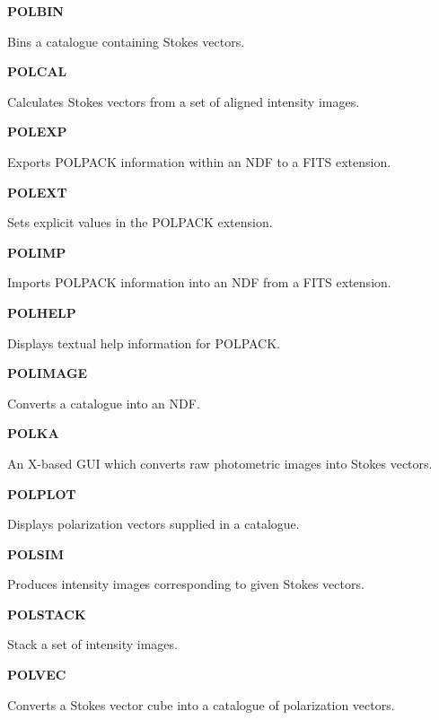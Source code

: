 \documentclass[twoside,11pt]{article}
\newenvironment{latexonly}{}{}
\renewcommand{\_}{\texttt{\symbol{95}}}
\newcommand{\quickdes}[3]{
                         \parbox{1.1in}{\bf #1}
                         \parbox{4.4in}{\raggedright #2 \dotfill}
                         \parbox{0.6in}{\pageref{#3}}
                         \vspace*{0.2in}}
\begin{document}
\newpage
\begin{latexonly}
\quickdes{POLBIN}{Bins a catalogue containing Stokes vectors.}{ POLBIN }

\quickdes{POLCAL}{Calculates Stokes vectors from a set of aligned intensity images.}{ POLCAL }

\quickdes{POLEXP}{Exports POLPACK information within an NDF to a FITS extension.}{ POLEXP }

\quickdes{POLEXT}{Sets explicit values in the POLPACK extension.}{ POLEXT }

\quickdes{POLIMP}{Imports POLPACK information into an NDF from a FITS extension.}{ POLEXP }

\quickdes{POLHELP}{Displays textual help information for POLPACK.}{ POLHELP }

\quickdes{POLIMAGE}{Converts a catalogue into an NDF.}{ POLIMAGE }

\quickdes{POLKA}{An X-based GUI which converts raw photometric images into Stokes vectors.}{ POLKA }

\quickdes{POLPLOT}{Displays polarization vectors supplied in a catalogue.}{ POLPLOT }

\quickdes{POLSIM}{Produces intensity images corresponding to given Stokes vectors.}{ POLSIM }

\quickdes{POLSTACK}{Stack a set of intensity images.}{ POLSTACK }

\quickdes{POLVEC}{Converts a Stokes vector cube into a catalogue of polarization vectors.}{ POLVEC }
\end{latexonly}
\end{document}
